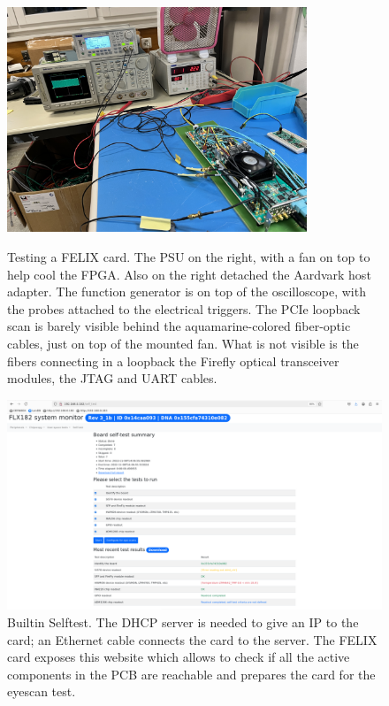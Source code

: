 \clearpage
\begin{figure}[htbp]
\begin{minipage}{0.9\textwidth}
\centering
\includegraphics[width=0.8\textwidth]{images/contributions/felix-card-testing.jpg}
\caption[FELIX card testing setup]{Testing a \acs{FELIX} card. The PSU on the right, with a fan on top to help cool the \acs{FPGA}. Also on the right detached the Aardvark host adapter. The function generator is on top of the oscilloscope, with the probes attached to the electrical triggers. The \acs{PCIe} loopback scan is barely visible behind the aquamarine-colored fiber-optic cables, just on top of the mounted fan. What is not visible is the fibers connecting in a loopback the Firefly \protect\cite{firefly-optical-transceiver} optical transceiver modules, the \acs{JTAG} and UART cables.}
\label{fig:felix-testing}
\end{minipage}\hfill
\begin{minipage}{0.9\textwidth}
\centering
\includegraphics[width=\textwidth]{images/contributions/BIST.png}
\caption[Builtin Selftest screenshot]{Builtin Selftest. The \acs{DHCP} server is needed to give an IP to the card; an Ethernet cable connects the card to the server. The \acs{FELIX} card exposes this website which allows to check if all the active components in the \acs{PCB} are reachable and prepares the card for the eyescan test.}
\label{fig:bist}
\end{minipage}
\end{figure}

